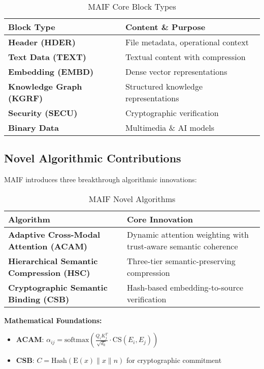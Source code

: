 \documentclass[conference]{IEEEtran}
\begin{document}
\begin{table}[!t]
\renewcommand{\arraystretch}{1.3}
\caption{MAIF Core Block Types}
\label{tab:block-types}
\centering
\footnotesize
\begin{tabular}{p{2.5cm}p{5.5cm}}
\toprule
\textbf{Block Type} & \textbf{Content \& Purpose} \\
\midrule
\textbf{Header (HDER)} & File metadata, operational context \\
\textbf{Text Data (TEXT)} & Textual content with compression \\
\textbf{Embedding (EMBD)} & Dense vector representations \\
\textbf{Knowledge Graph (KGRF)} & Structured knowledge representations \\
\textbf{Security (SECU)} & Cryptographic verification \\
\textbf{Binary Data} & Multimedia \& AI models \\
\bottomrule
\end{tabular}
\end{table}

\subsection{Novel Algorithmic Contributions}

MAIF introduces three breakthrough algorithmic innovations:

\begin{table}[!t]
\renewcommand{\arraystretch}{1.3}
\caption{MAIF Novel Algorithms}
\label{tab:novel-algorithms}
\centering
\footnotesize
\begin{tabular}{p{3cm}p{5cm}}
\toprule
\textbf{Algorithm} & \textbf{Core Innovation} \\
\midrule
\textbf{Adaptive Cross-Modal Attention (ACAM)} & Dynamic attention weighting with trust-aware semantic coherence \\
\textbf{Hierarchical Semantic Compression (HSC)} & Three-tier semantic-preserving compression \\
\textbf{Cryptographic Semantic Binding (CSB)} & Hash-based embedding-to-source verification \\
\bottomrule
\end{tabular}
\end{table}

\textbf{Mathematical Foundations:}
\begin{itemize}[leftmargin=*]
\item \textbf{ACAM}: $\alpha_{ij} = \text{softmax}\left(\frac{Q_i K_j^T}{\sqrt{d_k}} \cdot \text{CS}(E_i, E_j)\right)$
\item \textbf{CSB}: $C = \text{Hash}(\text{E}(x) \| x \| n)$ for cryptographic commitment
\end{itemize}
\end{document}
